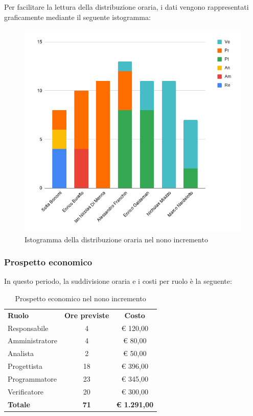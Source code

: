 \documentclass[../piano-di-progetto.tex]{subfiles}
\begin{document}
  Per facilitare la lettura della distribuzione oraria, i dati vengono rappresentati graficamente mediante il seguente istogramma:
  \begin{figure}[H]
    \centering
    \includegraphics[width=12cm]{img/ore-9-incr.png}
    \caption{Istogramma della distribuzione oraria nel nono incremento}
    \label{fig:ore-componente-progettazione}
  \end{figure}

  \subsubsection{Prospetto economico}
  In questo periodo, la suddivisione oraria e i costi per ruolo è la seguente:

  \begin{table}[H]
    \centering
    \begin{tabular}{lcc}
      \rowcolor{lightgray}
      \textbf{Ruolo}  & \textbf{Ore previste} & \textbf{Costo}      \\
Responsabile    & 4                     & € 120,00            \\
Amministratore  & 4                     & € 80,00             \\
Analista        & 2                     & € 50,00             \\
Progettista     & 18                    & € 396,00            \\
Programmatore   & 23                    & € 345,00            \\
Verificatore    & 20                    & € 300,00            \\
\textbf{Totale} & \textbf{71}           & \textbf{€ 1.291,00}
    \end{tabular}
    \caption{Prospetto economico nel nono incremento}
  \end{table}
\end{document}
